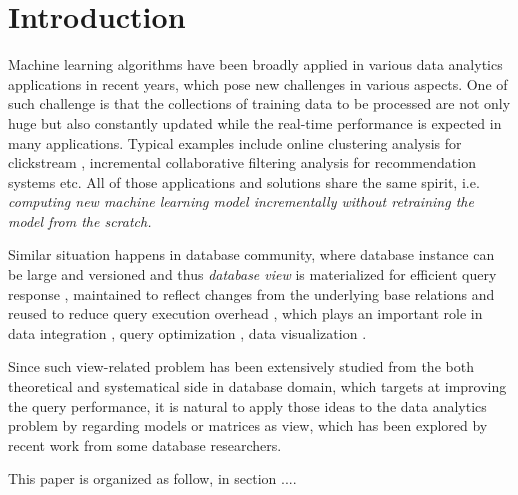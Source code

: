 \section{Introduction}

Machine learning algorithms have been broadly applied in various data analytics applications in recent years, which pose new challenges in various aspects. One of such challenge is that the collections of training data to be processed are not only huge but also constantly updated while the real-time performance is expected in many applications. Typical examples include online clustering analysis for clickstream \cite{guha2000clustering}, incremental collaborative filtering analysis for recommendation systems \cite{papagelis2005incremental} etc. All of those applications and solutions share the same spirit, i.e. {\em computing new machine learning model incrementally without retraining the model from the scratch.}

Similar situation happens in database community, where database instance can be large and versioned and thus {\em database view} is materialized for efficient query response \cite{date2006relational}, maintained to reflect changes from the underlying base relations \cite{gupta1993maintaining, green2007update} and reused to reduce query execution overhead \cite{halevy2001answering}, which plays an important role in data integration \cite{levy1996querying}, query optimization \cite{rajaraman1995answering}, data visualization \cite{brachman1993integrated}. 

Since such view-related problem has been extensively studied from the both theoretical and systematical side in database domain, which targets at improving the query performance, it is natural to apply those ideas to the data analytics problem by regarding models or matrices as view, which has been explored by recent work from some database researchers. 

This paper is organized as follow, in section ....